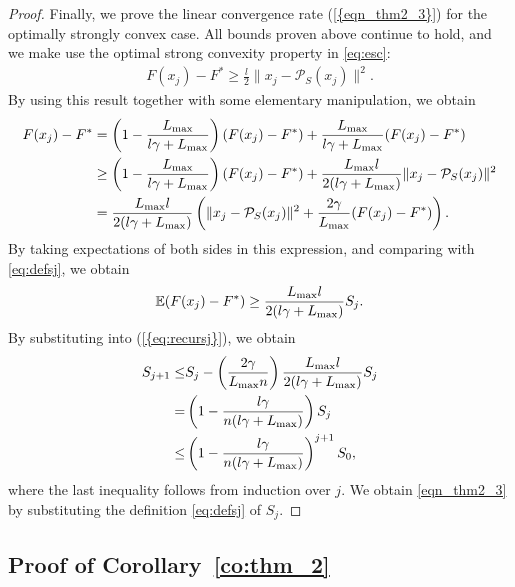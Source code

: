 \documentclass{siamltex}
\begin{document}
\begin{proof}
Finally, we prove the linear convergence rate {(\ref{{eqn_thm2_3}})} for
the optimally strongly convex case. All bounds proven above continue
to hold, and we make use the optimal strong convexity property in
\eqref{eq:esc}:
\begin{align*}
F(x_j) - F^* \geq \frac{l}{2}\|x_j - {\mathcal{P}_{S}}(x_j)\|^2.
\end{align*}
By using this result together with some elementary manipulation, we
obtain
\begin{align}
\nonumber
F(x_j) - F^* &= \left(1- \frac{L_{\mbox{\rm\scriptsize max}}}{l\gamma+{L_{\mbox{\rm\scriptsize max}}}}\right)(F(x_j) - F^*) +   \frac{L_{\mbox{\rm\scriptsize max}}}{l\gamma+{L_{\mbox{\rm\scriptsize max}}}}(F(x_j) - F^*)\\
\nonumber
&\geq \left(1- \frac{L_{\mbox{\rm\scriptsize max}}}{l\gamma+{L_{\mbox{\rm\scriptsize max}}}}\right)(F(x_j) - F^*) +   \frac{L_{\max}l}{2(l\gamma+{L_{\mbox{\rm\scriptsize max}}})}\|x_j - {\mathcal{P}_{S}}(x_j)\|^2\\
\label{eqn_proof2_9}
&= \frac{L_{\max}l}{2(l\gamma+{L_{\mbox{\rm\scriptsize max}}})}\left(\|x_j - {\mathcal{P}_{S}}(x_j)\|^2 + \frac{2\gamma}{L_{\mbox{\rm\scriptsize max}}}(F(x_j) - F^*)\right).
\end{align}
By taking expectations of both sides in this expression, and comparing with
\eqref{eq:defsj}, we obtain
\[
{\mathbb{E}} (F(x_j) - F^*) \ge \frac{{L_{\mbox{\rm\scriptsize max}}} l}{2(l \gamma+{L_{\mbox{\rm\scriptsize max}}})} S_j.
\]
By substituting into {(\ref{{eq:recursj}})}, we obtain
\begin{align*}
S_{j+1}  \le & S_j - \left(\frac{2 \gamma}{{L_{\mbox{\rm\scriptsize max}}} n}\right) \frac{{L_{\mbox{\rm\scriptsize max}}} l}{2(l \gamma+{L_{\mbox{\rm\scriptsize max}}})} S_j  
\\=& 
\left( 1-\frac{l \gamma}{n(l\gamma + {L_{\mbox{\rm\scriptsize max}}})} \right) S_j 
\\ \le & 
\left( 1-\frac{l \gamma}{n(l\gamma + {L_{\mbox{\rm\scriptsize max}}})} \right)^{j+1} S_0,
\end{align*}
where the last inequality follows from induction over $j$. We obtain
\eqref{eqn_thm2_3} by substituting the definition \eqref{eq:defsj} of
$S_j$.
\end{proof}

\subsection{Proof of Corollary~\ref{co:thm_2}}
\end{document}
